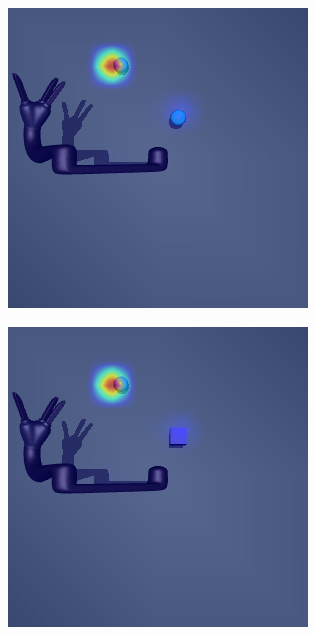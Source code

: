 \begin{figure}
  \begin{subfigure}{0.24\columnwidth}
    \includegraphics[width=\linewidth]{figures/chapter6/distractor_saliency_jaco_pro_on/color_sensor_std}
  \end{subfigure}
  \begin{subfigure}{0.24\columnwidth}
    \includegraphics[width=\linewidth]{figures/chapter6/distractor_saliency_jaco_pro_on/shape_sensor_std}

\end{subfigure}
\end{figure}
